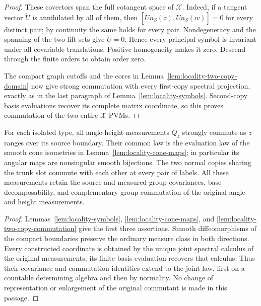 \begin{proof}
These covectors span the full cotangent space of $\mathcal X$.
Indeed, if a tangent vector $\dot U$ is annihilated by all of them,
then $[\dot U n_S(z),U n_S(w)]=0$ for every distinct pair; by
continuity the same holds for every pair.  Nondegeneracy and the
spanning of the two lift sets give $\dot U=0$.  Hence every
principal symbol is invariant under all covariable translations.
Positive homogeneity makes it zero.  Descend through the finite
orders to obtain order zero.

The compact graph cutoffs and the cores in
Lemma~\ref{lem:locality-two-copy-domain} now give strong commutation
with every first-copy spectral projection, exactly as in the last
paragraph of Lemma~\ref{lem:locality-symbols}.  Second-copy basis
evaluations recover its complete matrix coordinate, so this proves
commutation of the two entire $\mathcal X$ PVMs.
\end{proof}

\begin{proposition}
\label{prop:locality-isolated-commutation}
For each isolated type, all angle-height measurements $Q_z$ strongly
commute as $z$ ranges over its source boundary.  Their common law
is the evaluation law of the smooth cone isometries in
Lemma~\ref{lem:locality-cone-maps}; in particular its angular maps
are nonsingular smooth bijections.  The two normal copies sharing
the trunk slot commute with each other at every pair of labels.
All these measurements retain the source and measured-group
covariances, base decomposability, and complementary-group
commutation of the original angle and height measurements.
\end{proposition}

\begin{proof}
Lemmas~\ref{lem:locality-symbols},
\ref{lem:locality-cone-maps}, and
\ref{lem:locality-two-copy-commutation} give the first three
assertions.  Smooth diffeomorphisms of the compact boundaries
preserve the ordinary measure class in both directions.
Every constructed coordinate is obtained by the unique joint
spectral calculus of the original measurements; its finite basis
evaluation recovers that calculus.  Thus their covariance and
commutation identities extend to the joint law, first on a
countable determining algebra and then by normality.  No change
of representation or enlargement of the original commutant is
made in this passage.
\end{proof}
